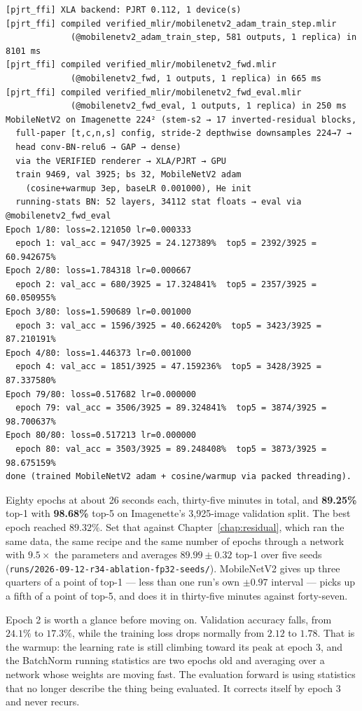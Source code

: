 \begin{verbatim}
[pjrt_ffi] XLA backend: PJRT 0.112, 1 device(s)
[pjrt_ffi] compiled verified_mlir/mobilenetv2_adam_train_step.mlir
             (@mobilenetv2_adam_train_step, 581 outputs, 1 replica) in 8101 ms
[pjrt_ffi] compiled verified_mlir/mobilenetv2_fwd.mlir
             (@mobilenetv2_fwd, 1 outputs, 1 replica) in 665 ms
[pjrt_ffi] compiled verified_mlir/mobilenetv2_fwd_eval.mlir
             (@mobilenetv2_fwd_eval, 1 outputs, 1 replica) in 250 ms
MobileNetV2 on Imagenette 224² (stem-s2 → 17 inverted-residual blocks,
  full-paper [t,c,n,s] config, stride-2 depthwise downsamples 224→7 →
  head conv-BN-relu6 → GAP → dense)
  via the VERIFIED renderer → XLA/PJRT → GPU
  train 9469, val 3925; bs 32, MobileNetV2 adam
    (cosine+warmup 3ep, baseLR 0.001000), He init
  running-stats BN: 52 layers, 34112 stat floats → eval via @mobilenetv2_fwd_eval
Epoch 1/80: loss=2.121050 lr=0.000333
  epoch 1: val_acc = 947/3925 = 24.127389%  top5 = 2392/3925 = 60.942675%
Epoch 2/80: loss=1.784318 lr=0.000667
  epoch 2: val_acc = 680/3925 = 17.324841%  top5 = 2357/3925 = 60.050955%
Epoch 3/80: loss=1.590689 lr=0.001000
  epoch 3: val_acc = 1596/3925 = 40.662420%  top5 = 3423/3925 = 87.210191%
Epoch 4/80: loss=1.446373 lr=0.001000
  epoch 4: val_acc = 1851/3925 = 47.159236%  top5 = 3428/3925 = 87.337580%
Epoch 79/80: loss=0.517682 lr=0.000000
  epoch 79: val_acc = 3506/3925 = 89.324841%  top5 = 3874/3925 = 98.700637%
Epoch 80/80: loss=0.517213 lr=0.000000
  epoch 80: val_acc = 3503/3925 = 89.248408%  top5 = 3873/3925 = 98.675159%
done (trained MobileNetV2 adam + cosine/warmup via packed threading).
\end{verbatim}

Eighty epochs at about 26 seconds each, thirty-five minutes in total, and
\textbf{89.25\%} top-1 with \textbf{98.68\%} top-5 on Imagenette's
3,925-image validation split. The best epoch reached $89.32\%$. Set that
against Chapter~\ref{chap:residual}, which ran the same data, the same
recipe and the same number of epochs through a network with
$9.5\times$ the parameters and averages $89.99 \pm 0.32$ top-1 over five seeds
(\texttt{runs/2026-09-12-r34-ablation-fp32-seeds/}). MobileNetV2 gives up three quarters of
a point of top-1 --- less than one run's own $\pm 0.97$ interval --- picks
up a fifth of a point of top-5, and does it in thirty-five minutes
against forty-seven.

Epoch 2 is worth a glance before moving on. Validation accuracy
falls, from $24.1\%$ to $17.3\%$, while the training loss drops
normally from $2.12$ to $1.78$. That is the warmup: the learning rate is
still climbing toward its peak at epoch 3, and the BatchNorm running
statistics are two epochs old and averaging over a network whose weights
are moving fast. The evaluation forward is using statistics that no
longer describe the thing being evaluated. It corrects itself by epoch 3
and never recurs.


